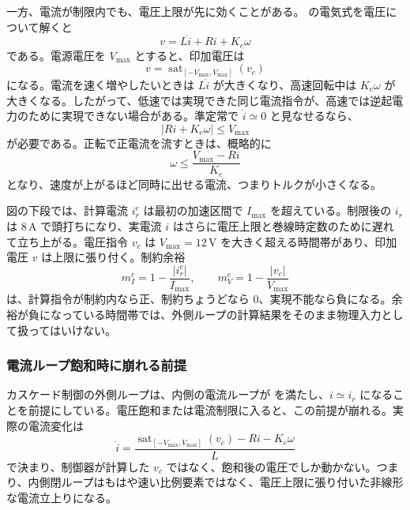 一方、電流が制限内でも、電圧上限が先に効くことがある。 の電気式を電圧について解くと
\begin{equation}
  v=L\dot{i}+Ri+K_e\omega
  \label{eq:voltage-required-current}
\end{equation}
である。電源電圧を $V_{\max}$ とすると、印加電圧は
\begin{equation}
  v=\operatorname{sat}_{[-V_{\max},V_{\max}]}(v_c)
  \label{eq:voltage-command-limit}
\end{equation}
になる。電流を速く増やしたいときは $L\dot{i}$ が大きくなり、高速回転中は $K_e\omega$ が大きくなる。したがって、低速では実現できた同じ電流指令が、高速では逆起電力のために実現できない場合がある。準定常で $\dot{i}\simeq0$ と見なせるなら、
\begin{equation}
  |Ri+K_e\omega|\leq V_{\max}
  \label{eq:steady-voltage-limit}
\end{equation}
が必要である。正転で正電流を流すときは、概略的に
\begin{equation}
  \omega\leq\frac{V_{\max}-Ri}{K_e}
  \label{eq:voltage-speed-current-limit}
\end{equation}
となり、速度が上がるほど同時に出せる電流、つまりトルクが小さくなる。

図の下段では、計算電流 $i_r^c$ は最初の加速区間で $I_{\max}$ を超えている。制限後の $i_r$ は $8\,\mathrm{A}$ で頭打ちになり、実電流 $i$ はさらに電圧上限と巻線時定数のために遅れて立ち上がる。電圧指令 $v_c$ は $V_{\max}=12\,\mathrm{V}$ を大きく超える時間帯があり、印加電圧 $v$ は上限に張り付く。制約余裕
\begin{equation}
  m_I^c=1-\frac{|i_r^c|}{I_{\max}},
  \qquad
  m_V^c=1-\frac{|v_c|}{V_{\max}}
  \label{eq:constraint-margin}
\end{equation}
は、計算指令が制約内なら正、制約ちょうどなら 0、実現不能なら負になる。余裕が負になっている時間帯では、外側ループの計算結果をそのまま物理入力として扱ってはいけない。

\subsubsection{電流ループ飽和時に崩れる前提}

カスケード制御の外側ループは、内側の電流ループが  を満たし、$i\simeq i_r$ になることを前提にしている。電圧飽和または電流制限に入ると、この前提が崩れる。実際の電流変化は
\begin{equation}
  \dot{i}
  =
  \frac{
  \operatorname{sat}_{[-V_{\max},V_{\max}]}(v_c)-Ri-K_e\omega
  }{L}
  \label{eq:saturated-current-dynamics}
\end{equation}
で決まり、制御器が計算した $v_c$ ではなく、飽和後の電圧でしか動かない。つまり、内側閉ループはもはや速い比例要素ではなく、電圧上限に張り付いた非線形な電流立上りになる。

